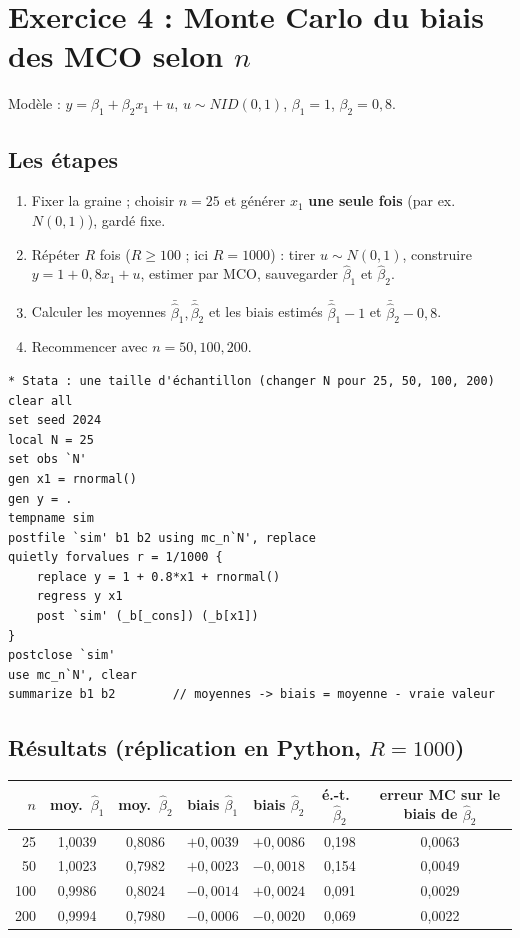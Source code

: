 \documentclass[11pt,a4paper]{article}
\begin{document}
\section{Exercice 4 : Monte Carlo du biais des MCO selon $n$}

Modèle : $y=\beta_1+\beta_2x_1+u$, $u\sim NID(0,1)$, $\beta_1=1$, $\beta_2=0{,}8$.

\subsection*{Les étapes}
\begin{enumerate}[nosep]
\item Fixer la graine ; choisir $n=25$ et générer $x_1$ \textbf{une seule fois} (par ex. $N(0,1)$), gardé fixe.
\item Répéter $R$ fois ($R\ge100$ ; ici $R=1000$) : tirer $u\sim N(0,1)$, construire $y=1+0{,}8x_1+u$, estimer par MCO, sauvegarder $\hat\beta_1$ et $\hat\beta_2$.
\item Calculer les moyennes $\bar{\hat\beta}_1,\bar{\hat\beta}_2$ et les biais estimés $\bar{\hat\beta}_1-1$ et $\bar{\hat\beta}_2-0{,}8$.
\item Recommencer avec $n=50,100,200$.
\end{enumerate}

\begin{lstlisting}
* Stata : une taille d'échantillon (changer N pour 25, 50, 100, 200)
clear all
set seed 2024
local N = 25
set obs `N'
gen x1 = rnormal()
gen y = .
tempname sim
postfile `sim' b1 b2 using mc_n`N', replace
quietly forvalues r = 1/1000 {
    replace y = 1 + 0.8*x1 + rnormal()
    regress y x1
    post `sim' (_b[_cons]) (_b[x1])
}
postclose `sim'
use mc_n`N', clear
summarize b1 b2        // moyennes -> biais = moyenne - vraie valeur
\end{lstlisting}

\subsection*{Résultats (réplication en Python, $R=1000$)}
\begin{center}
\begin{tabular}{@{}rcccccc@{}}
\toprule
$n$ & moy.\ $\hat\beta_1$ & moy.\ $\hat\beta_2$ & biais $\hat\beta_1$ & biais $\hat\beta_2$ & é.-t.\ $\hat\beta_2$ & erreur MC sur le biais de $\hat\beta_2$ \\
\midrule
25 & 1,0039 & 0,8086 & $+0{,}0039$ & $+0{,}0086$ & 0,198 & 0,0063 \\
50 & 1,0023 & 0,7982 & $+0{,}0023$ & $-0{,}0018$ & 0,154 & 0,0049 \\
100 & 0,9986 & 0,8024 & $-0{,}0014$ & $+0{,}0024$ & 0,091 & 0,0029 \\
200 & 0,9994 & 0,7980 & $-0{,}0006$ & $-0{,}0020$ & 0,069 & 0,0022 \\
\bottomrule
\end{tabular}
\end{center}
\end{document}
